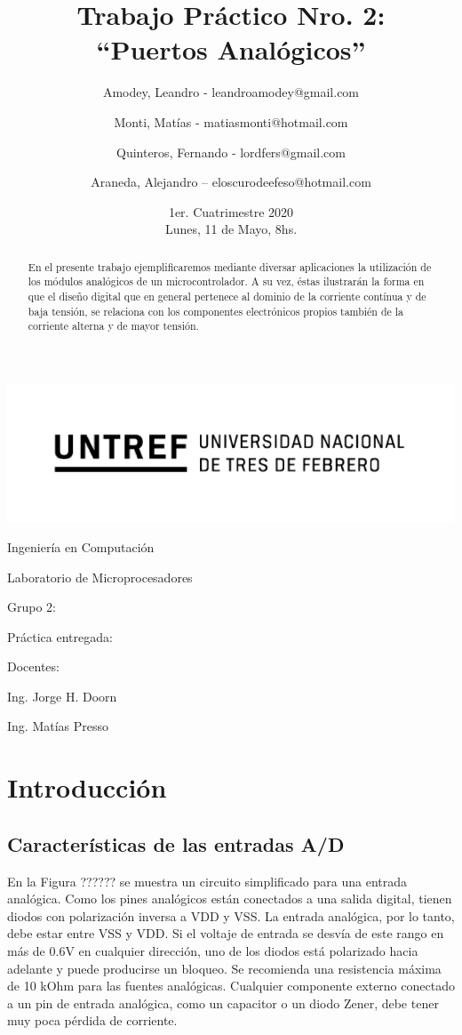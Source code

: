 \documentclass[a4paper]{article}
\title{Trabajo Práctico Nro. 2:\\“Puertos Analógicos”}
\author{Amodey, Leandro - leandroamodey@gmail.com
\and Monti, Matías - matiasmonti@hotmail.com
\and Quinteros, Fernando - lordfers@gmail.com
\and Araneda, Alejandro – eloscurodeefeso@hotmail.com}
\date{1er. Cuatrimestre 2020\\Lunes, 11 de Mayo, 8hs.}
\def\teacher{Ing. Jorge H. Doorn
\and Ing. Matías Presso}
\begin{document}

\begin{titlepage}\renewcommand\and\par\centering\makeatletter
    \includegraphics{logo.png}\par
    {\Large Ingeniería en Computación \par}\vspace{0.5cm}
    {\LARGE Laboratorio de Microprocesadores \par}\vfill
    {\huge \@title \par}\vfill
    Grupo 2:\par
    \@author\vfill
    Práctica entregada:\par
    \@date\vfill
    Docentes:\par
    \teacher\vspace{1cm}\makeatother
\end{titlepage}

\begin{abstract}

    En el presente trabajo ejemplificaremos mediante diversar 
    aplicaciones la utilización de los módulos analógicos de un 
    microcontrolador. A su vez, éstas ilustrarán la forma en que el 
    diseño digital que en general pertenece al dominio de la 
    corriente contínua y de baja tensión, se relaciona con los 
    componentes electrónicos propios también de la corriente alterna 
    y de mayor tensión.

\end{abstract}

\section{Introducción}

\subsection*{Características de las entradas A/D}

En la Figura ?????? se muestra un circuito simplificado para una
entrada analógica. Como los pines analógicos están conectados
a una salida digital, tienen diodos con polarización inversa a VDD y VSS.
La entrada analógica, por lo tanto, debe estar entre VSS y VDD.
Si el voltaje de entrada se desvía de este rango en más de 0.6V
en cualquier dirección, uno de los diodos está polarizado hacia adelante
y puede producirse un bloqueo.
Se recomienda una resistencia máxima de 10 kOhm para las fuentes analógicas.
Cualquier componente externo conectado a un pin de entrada analógica,
como un capacitor o un diodo Zener, debe tener muy poca pérdida de corriente.
\end{document}
